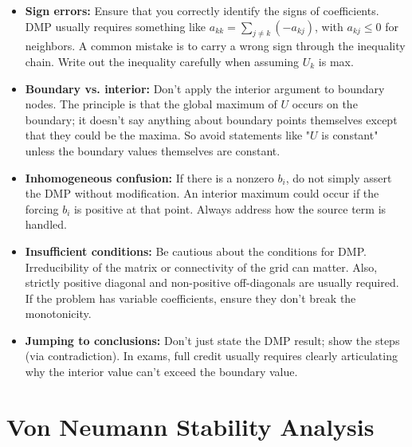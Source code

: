\documentclass[a4paper,11pt]{report}
\begin{document}
\begin{itemize}
    \item \textbf{Sign errors:} Ensure that you correctly identify the signs of coefficients. DMP usually requires something like $a_{kk} = \sum_{j\ne k}(-a_{kj})$, with $a_{kj} \le 0$ for neighbors. A common mistake is to carry a wrong sign through the inequality chain. Write out the inequality carefully when assuming $U_k$ is max.

    \item \textbf{Boundary vs. interior:} Don't apply the interior argument to boundary nodes. The principle is that the global maximum of $U$ occurs on the boundary; it doesn't say anything about boundary points themselves except that they could be the maxima. So avoid statements like "$U$ is constant" unless the boundary values themselves are constant.

    \item \textbf{Inhomogeneous confusion:} If there is a nonzero $b_i$, do not simply assert the DMP without modification. An interior maximum could occur if the forcing $b_i$ is positive at that point. Always address how the source term is handled.

    \item \textbf{Insufficient conditions:} Be cautious about the conditions for DMP. Irreducibility of the matrix or connectivity of the grid can matter. Also, strictly positive diagonal and non-positive off-diagonals are usually required. If the problem has variable coefficients, ensure they don't break the monotonicity.

    \item \textbf{Jumping to conclusions:} Don't just state the DMP result; show the steps (via contradiction). In exams, full credit usually requires clearly articulating why the interior value can't exceed the boundary value.
\end{itemize}

\chapter{Von Neumann Stability Analysis}
\end{document}
